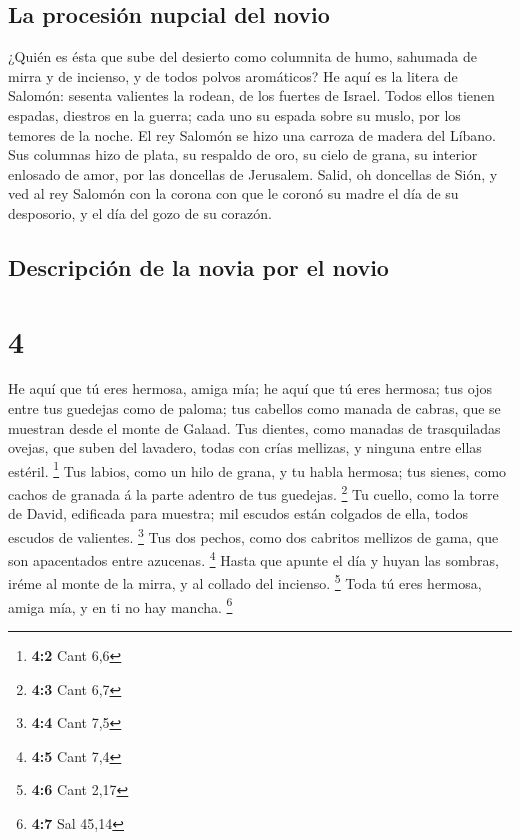 \hypertarget{la-procesiuxf3n-nupcial-del-novio}{%
\subsection{La procesión nupcial del
novio}\label{la-procesiuxf3n-nupcial-del-novio}}

 ¿Quién es ésta que sube del desierto como columnita de
humo, sahumada de mirra y de incienso, y de todos polvos aromáticos?
 He aquí es la litera de Salomón: sesenta valientes la
rodean, de los fuertes de Israel.  Todos ellos tienen
espadas, diestros en la guerra; cada uno su espada sobre su muslo, por
los temores de la noche.  El rey Salomón se hizo una carroza
de madera del Líbano.  Sus columnas hizo de plata, su
respaldo de oro, su cielo de grana, su interior enlosado de amor, por
las doncellas de Jerusalem.  Salid, oh doncellas de Sión, y
ved al rey Salomón con la corona con que le coronó su madre el día de su
desposorio, y el día del gozo de su corazón.

\hypertarget{descripciuxf3n-de-la-novia-por-el-novio}{%
\subsection{Descripción de la novia por el
novio}\label{descripciuxf3n-de-la-novia-por-el-novio}}

\hypertarget{section-3}{%
\section{4}\label{section-3}}

 He aquí que tú eres hermosa, amiga mía; he aquí que tú eres
hermosa; tus ojos entre tus guedejas como de paloma; tus cabellos como
manada de cabras, que se muestran desde el monte de Galaad. 
Tus dientes, como manadas de trasquiladas ovejas, que suben del
lavadero, todas con crías mellizas, y ninguna entre ellas estéril.
\footnote{\textbf{4:2} Cant 6,6}  Tus labios, como un hilo
de grana, y tu habla hermosa; tus sienes, como cachos de granada á la
parte adentro de tus guedejas. \footnote{\textbf{4:3} Cant 6,7}
 Tu cuello, como la torre de David, edificada para muestra;
mil escudos están colgados de ella, todos escudos de valientes.
\footnote{\textbf{4:4} Cant 7,5}  Tus dos pechos, como dos
cabritos mellizos de gama, que son apacentados entre azucenas.
\footnote{\textbf{4:5} Cant 7,4}  Hasta que apunte el día y
huyan las sombras, iréme al monte de la mirra, y al collado del
incienso. \footnote{\textbf{4:6} Cant 2,17}  Toda tú eres
hermosa, amiga mía, y en ti no hay mancha. \footnote{\textbf{4:7} Sal
  45,14}

